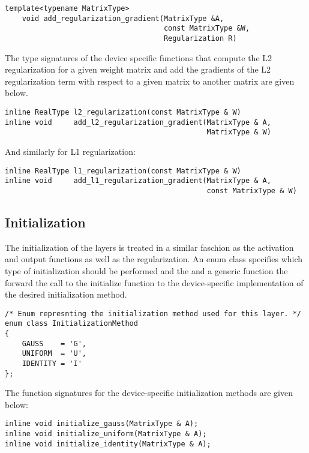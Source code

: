 \documentclass[a4paper,11pt,bibtotoc,xcolor=dvipsnames]{scrartcl}
\begin{document}
\begin{verbatim}
template<typename MatrixType>
    void add_regularization_gradient(MatrixType &A,
                                     const MatrixType &W,
                                     Regularization R)
\end{verbatim}

The type signatures of the device specific functions that compute the L2
regularization for a given weight matrix and add the gradients of the L2
regularization term with respect to a given matrix to another matrix are
given below.

\begin{verbatim}
inline RealType l2_regularization(const MatrixType & W)
inline void     add_l2_regularization_gradient(MatrixType & A,
                                               MatrixType & W)
\end{verbatim}

And similarly for L1 regularization:

\begin{verbatim}
inline RealType l1_regularization(const MatrixType & W)
inline void     add_l1_regularization_gradient(MatrixType & A,
                                               const MatrixType & W)
\end{verbatim}

\subsection{Initialization}

The initialization of the layers is treated in a similar faschion as the
activation and output functions as well as the regularization. An enum class
specifies which type of initialization should be performed and the and a generic
function the forward the call to the initialize function to the device-specific
implementation of the desired initialization method.

\begin{verbatim}
/* Enum represnting the initialization method used for this layer. */
enum class InitializationMethod
{
    GAUSS    = 'G',
    UNIFORM  = 'U',
    IDENTITY = 'I'
};
\end{verbatim}

The function signatures for the device-specific initialization methods are given
below:

\begin{verbatim}
inline void initialize_gauss(MatrixType & A);
inline void initialize_uniform(MatrixType & A);
inline void initialize_identity(MatrixType & A);
\end{verbatim}
\end{document}
